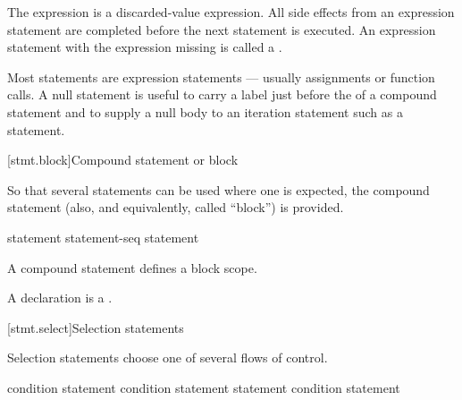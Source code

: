 The expression is
a discarded-value expression.
All
%
side effects from an expression statement
are completed before the next statement is executed.
%
%
An expression statement with the expression missing is called
a .
\begin{note}
Most statements are expression statements --- usually assignments or
function calls. A null statement is useful to carry a label just before
the \tcode{\}} of a compound statement and to supply a null body to an
iteration statement such as a 
statement.
\end{note}

[stmt.block]{Compound statement or block}%
%
%

\pnum
So that several statements can be used where one is expected, the
compound statement (also, and equivalently, called ``block'') is
provided.

\begin{bnf}
\br
    \terminal{\{}  \terminal{\}}
\end{bnf}

\begin{bnf}
\br
    statement\br
    statement-seq statement
\end{bnf}

A compound statement defines a block scope.
\begin{note}
A declaration is a .
\end{note}

[stmt.select]{Selection statements}%

\pnum
Selection statements choose one of several flows of control.

%
%
%
\begin{bnf}
\br
      \terminal{(}  condition \terminal{)} statement\br
      \terminal{(}  condition \terminal{)} statement  statement\br
     \terminal{(}  condition \terminal{)} statement
\end{bnf}

